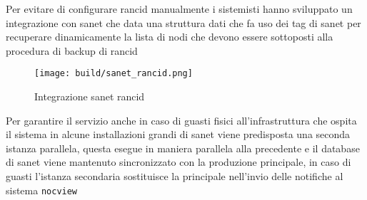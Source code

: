 \documentclass[12pt,a4paper,twoside,openright]{book}
\begin{document}
Per evitare di configurare rancid manualmente i sistemisti hanno sviluppato un integrazione con sanet che data una struttura dati che fa uso dei tag di sanet per recuperare dinamicamente la lista di nodi che devono essere sottoposti alla procedura di backup di rancid

\begin{figure}[H]
    \centering
    \texttt{[image: build/sanet\_rancid.png]}
    \caption{Integrazione sanet rancid}
    \label{fig:enter-label}
\end{figure}

Per garantire il servizio anche in caso di guasti fisici all'infrastruttura che ospita il sistema in alcune installazioni grandi di sanet viene predisposta una seconda istanza parallela, questa esegue in maniera parallela alla precedente e il database di sanet viene mantenuto sincronizzato con la produzione principale, in caso di guasti l'istanza secondaria sostituisce la principale nell'invio delle notifiche al sistema \verb|nocview|

%
%
%
%
%
\end{document}
